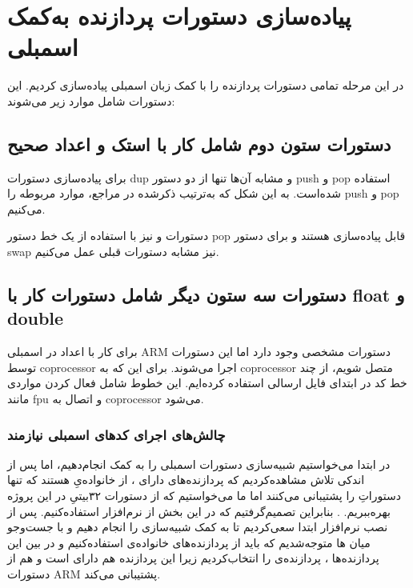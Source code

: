 \section*{پیاده‌سازی دستورات پردازنده به‌کمک
	اسمبلی
}

در این مرحله تمامی دستورات پردازنده را با کمک زبان اسمبلی
پیاده‌سازی کردیم. این دستورات شامل موارد زیر می‌شوند:

\subsection*{دستورات ستون دوم شامل کار با استک و اعداد صحیح}

برای پیاده‌سازی دستورات dup و مشابه آن‌ها تنها از دو دستور push و pop استفاده شده‌است. به این شکل که به‌ترتیب ذکرشده در مراجع، موارد مربوطه را push و pop می‌کنیم.

دستورات
و
نیز با استفاده از یک خط دستور pop قابل پیاده‌سازی هستند و برای دستور swap نیز مشابه دستورات قبلی عمل می‌کنیم.

\subsection*{دستورات سه ستون دیگر شامل دستورات کار با float و double}

برای کار با اعداد 
در اسمبلی
ARM دستورات مشخصی وجود دارد اما این دستورات توسط coprocessor اجرا می‌شوند. برای این که به coprocessor متصل شویم، از چند خط کد در ابتدای فایل 
ارسالی استفاده کرده‌ایم. این خطوط شامل فعال کردن مواردی مانند fpu و اتصال به coprocessor می‌شود.

\subsubsection*{چالش‌های اجرای کدهای اسمبلی نیازمند
}
در ابتدا می‌خواستیم شبیه‌سازی دستورات اسمبلی را به کمک
 انجام‌دهیم، اما پس از اندکی تلاش مشاهده‌کردیم که پردازنده‌های دارای
،
 از خانواده‌یِ
هستند که تنها دستوراتِ
  را پشتیبانی می‌کنند اما ما می‌خواستیم که از دستورات ۳۲بیتیِ
   در این پروژه بهره‌ببریم.
  .
  بنابراین تصمیم‌گرفتیم که در این بخش از نرم‌افزار
   استفاده‌کنیم. پس از نصب نرم‌افزار
 ابتدا سعی‌کردیم تا به کمک 
    شبیه‌سازی را انجام دهیم و با جست‌وجو میان
ها
 متوجه‌شدیم که باید از پردازنده‌های خانواده‌ی
 استفاده‌کنیم و در بین این پردازنده‌ها ، پردازنده‌ی
 را انتخاب‌کردیم زیرا این پردازنده هم دارای
 است و هم از دستورات ARM پشتیبانی می‌کند.

